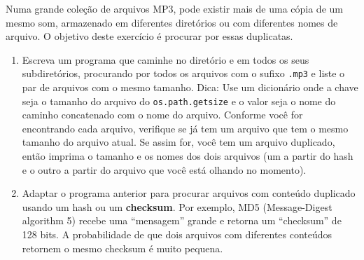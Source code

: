 \begin{ex}

\label{checksum}


Numa grande coleção de arquivos MP3, pode existir mais de uma 
cópia de um mesmo som, armazenado em diferentes diretórios ou com 
diferentes nomes de arquivo. O objetivo deste exercício é 
procurar por essas duplicatas.
%
\begin{enumerate}

\item Escreva um programa que caminhe no diretório e em todos os seus
subdiretórios, procurando por todos os arquivos com o sufixo {\tt .mp3}
e liste o par de arquivos com o mesmo tamanho.
Dica: Use um dicionário onde a chave seja o tamanho
do arquivo do {\tt os.path.getsize} e o valor seja o nome do caminho 
concatenado com o nome do arquivo.
Conforme você for encontrando cada arquivo, verifique se já tem um
arquivo que tem o mesmo tamanho do arquivo atual. Se assim for, você tem um
arquivo duplicado, então imprima o tamanho e os nomes dos dois arquivos
(um a partir do hash e o outro a partir do arquivo que você está olhando no momento).


\item Adaptar o programa anterior para procurar arquivos
com conteúdo duplicado usando um hash ou um {\bf checksum}. Por exemplo,
MD5 (Message-Digest algorithm 5) recebe uma ``mensagem'' grande
e retorna um ``checksum'' de 128 bits. A probabilidade
de que dois arquivos com diferentes conteúdos retornem o mesmo checksum
é muito pequena.


\end{enumerate}
\end{ex}
